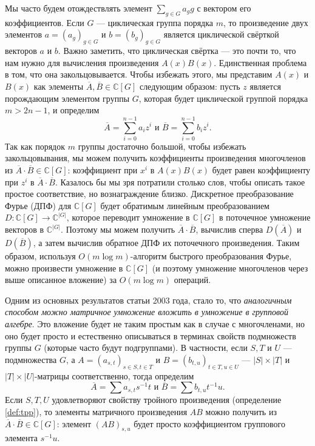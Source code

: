 Мы часто будем отождествлять элемент $\sum_{g \in G} a_g g$ с вектором его коэффициентов. Если $G$ --- циклическая группа порядка $m$, то произведение двух элементов $a=(a_g)_{g \in G}$ и $b=(b_g)_{g \in G}$ является циклической свёрткой векторов $a$ и $b$. Важно заметить, что циклическая свёртка --- это почти то, что нам нужно для вычисления произведения $A(x)B(x)$. Единственная проблема в том, что она закольцовывается. Чтобы избежать этого, мы представим $A(x)$ и $B(x)$ как элементы $\overline{A}, \overline{B} \in \mathbb{C}[G]$ следующим образом: пусть $z$ является порождающим элементом группы $G$, которая будет циклической группой порядка $m > 2n-1$, и определим
\[
	\overline{A}=\sum_{i=0}^{n-1} a_i z^i \text{ и } \overline{B}=\sum_{i=0}^{n-1} b_i z^i.
\]
Так как порядок $m$ группы достаточно большой, чтобы избежать закольцовывания, мы можем получить коэффициенты произведения многочленов из $\overline{A} \cdot \overline{B} \in \mathbb{C}[G]$: коэффициент при $x^i$ в $A(x)B(x)$ будет равен коэффициенту при $z^i$ в $\overline{A} \cdot \overline{B}$. Казалось бы мы зря потратили столько слов, чтобы описать такое простое соответствие, но вознаграждение близко. Дискретное преобразование Фурье (ДПФ) для $\mathbb{C}[G]$ будет обратимым линейным преобразованием $D:\mathbb{C}[G] \to \mathbb{C}^{|G|}$, которое переводит умножение в $\mathbb{C}[G]$ в поточечное умножение векторов в $\mathbb{C}^{|G|}$. Поэтому мы можем получить $\overline{A} \cdot \overline{B}$, вычислив сперва $D(\overline{A})$ и $D(\overline{B})$, а затем вычислив обратное ДПФ их поточечного произведения. Таким образом, используя $O(m \log m)$-алгоритм быстрого преобразования Фурье, можно произвести умножение в $\mathbb{C}[G]$ (и поэтому умножение многочленов через выше описанное вложение) за $O(m \log m)$ операций.

Одним из основных результатов статьи 2003 года, стало то, что \textit{аналогичным способом можно матричное умножение вложить в умножение в групповой алгебре}. Это вложение будет не таким простым как в случае с многочленами, но оно будет просто и естественно описываться в терминах свойств подмножеств группы $G$ (которые часто будут подгруппами). В частности, если $S,T$ и $U$ --- подмножества $G$, а $A=(a_{s,t})_{s \in S, t \in T}$ и $B=(b_{t,u})_{t \in T, u \in U}$ --- $|S| \times |T|$ и $|T| \times |U|$-матрицы соответственно, тогда определим
\[
	\overline{A}=\sum a_{s,t} s^{-1}t \text{ и } \overline{B}=\sum b_{t,u} t^{-1}u.
\]
Если $S,T,U$ удовлетворяют свойству тройного произведения (определение \ref{def:tpp}), то элементы матричного произведения $AB$ можно получить из $\overline{A} \cdot \overline{B} \in \mathbb{C}[G]$: элемент $(AB)_{s,u}$ будет просто коэффициентом группового элемента $s^{-1}u$.

